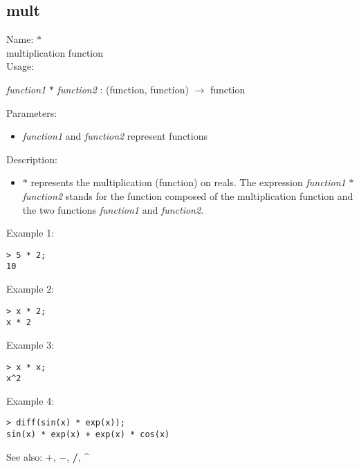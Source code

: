 \subsection{ mult }
\noindent Name: \textbf{$*$}\\
multiplication function\\

\noindent Usage: 
\begin{center}
\emph{function1} \textbf{$*$} \emph{function2} : (\textsf{function}, \textsf{function}) $\rightarrow$ \textsf{function}\\
\end{center}
Parameters: 
\begin{itemize}
\item \emph{function1} and \emph{function2} represent functions
\end{itemize}
\noindent Description: \begin{itemize}

\item \textbf{$*$} represents the multiplication (function) on reals. 
   The expression \emph{function1} \textbf{$*$} \emph{function2} stands for
   the function composed of the multiplication function and the two
   functions \emph{function1} and \emph{function2}.
\end{itemize}
\noindent Example 1: 
\begin{center}\begin{minipage}{15cm}\begin{Verbatim}[frame=single]
> 5 * 2;
10
\end{Verbatim}
\end{minipage}\end{center}
\noindent Example 2: 
\begin{center}\begin{minipage}{15cm}\begin{Verbatim}[frame=single]
> x * 2;
x * 2
\end{Verbatim}
\end{minipage}\end{center}
\noindent Example 3: 
\begin{center}\begin{minipage}{15cm}\begin{Verbatim}[frame=single]
> x * x;
x^2
\end{Verbatim}
\end{minipage}\end{center}
\noindent Example 4: 
\begin{center}\begin{minipage}{15cm}\begin{Verbatim}[frame=single]
> diff(sin(x) * exp(x));
sin(x) * exp(x) + exp(x) * cos(x)
\end{Verbatim}
\end{minipage}\end{center}
See also: \textbf{$+$}, \textbf{$-$}, \textbf{/}, \textbf{\^}

